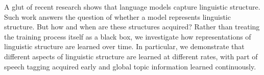 A glut of recent research shows that language models capture linguistic structure. Such work answers the question of whether a model represents linguistic structure. But how and when are these structures acquired? Rather than treating the training process itself as a black box, we investigate how representations of linguistic structure are learned over time. In particular, we demonstrate that different aspects of linguistic structure are learned at different rates, with part of speech tagging acquired early and global topic information learned continuously.
